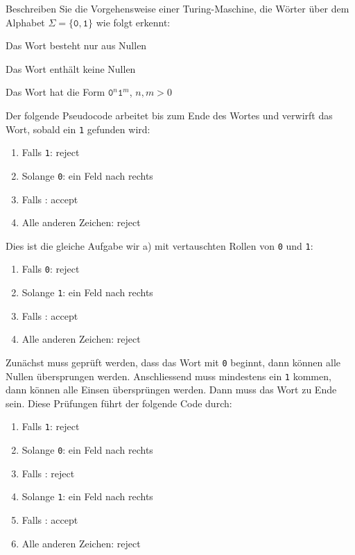 Beschreiben Sie die Vorgehensweise einer Turing-Maschine, die Wörter
über dem Alphabet $\Sigma=\{\texttt{0},\texttt{1}\}$ wie folgt erkennt:
\begin{teilaufgaben}
\item Das Wort besteht nur aus Nullen
\item Das Wort enthält keine Nullen
\item Das Wort hat die Form $\texttt{0}^n\texttt{1}^m$, $n,m>0$
\end{teilaufgaben}

\begin{loesung}
\begin{teilaufgaben}
\item 
Der folgende Pseudocode arbeitet bis zum Ende des Wortes und verwirft
das Wort, sobald ein \texttt{1} gefunden wird:
\begin{enumerate}[1.]
\item Falls \texttt{1}: {\color{darkred}reject}
\item Solange \texttt{0}: ein Feld nach rechts
\item Falls \blank: {\color{darkgreen}accept}
\item Alle anderen Zeichen: {\color{darkred}reject}
\end{enumerate}
\item 
Dies ist die gleiche Aufgabe wir a) mit vertauschten Rollen von
\texttt{0} und \texttt{1}:
\begin{enumerate}[1.]
\item Falls \texttt{0}: {\color{darkred}reject}
\item Solange \texttt{1}: ein Feld nach rechts
\item Falls \blank: {\color{darkgreen}accept}
\item Alle anderen Zeichen: {\color{darkred}reject}
\end{enumerate}
\item
Zunächst muss geprüft werden, dass das Wort mit \texttt{0} beginnt,
dann können alle Nullen übersprungen werden.
Anschliessend muss mindestens ein \texttt{1} kommen, dann können alle
Einsen übersprüngen werden.
Dann muss das Wort zu Ende sein.
Diese Prüfungen führt der folgende Code durch:
\begin{enumerate}[1.]
\item Falls \texttt{1}: {\color{darkred}reject}
\item Solange \texttt{0}: ein Feld nach rechts
\item Falls \blank: {\color{darkred}reject}
\item Solange \texttt{1}: ein Feld nach rechts
\item Falls \blank: {\color{darkgreen}accept}
\item Alle anderen Zeichen: {\color{darkred}reject}
\end{enumerate}
\end{teilaufgaben}
\end{loesung}
